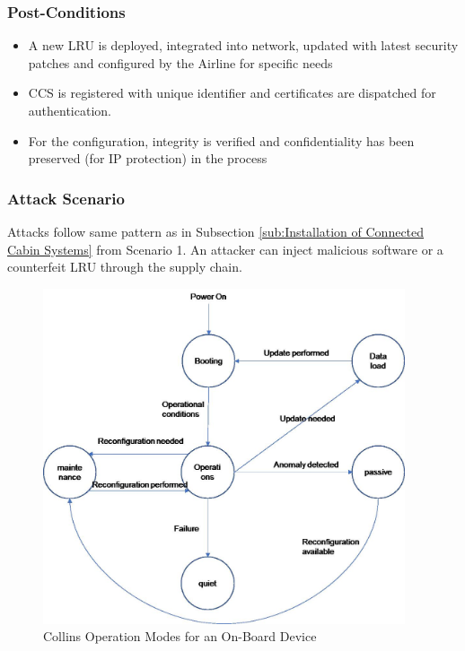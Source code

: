 \subsubsection{Post-Conditions}
\begin{itemize}
	\item A new LRU  is deployed, integrated into network, updated with latest security patches and configured by
	      the Airline for specific needs
	\item CCS is registered with unique identifier and certificates are dispatched for authentication.
	\item For the configuration, integrity is verified and confidentiality has been preserved (for IP protection)
	      in the process
\end{itemize}

\subsubsection{Attack Scenario}

Attacks follow same pattern as in Subsection \ref{sub:Installation of Connected Cabin Systems} from Scenario 1.
An attacker can inject malicious software or a counterfeit LRU through the supply chain.

\begin{figure}
	\begin{center}
		\includegraphics[width=0.95\textwidth]{figures/collins-opmodes.jpg}
	\end{center}
	\caption{Collins Operation Modes for an On-Board Device}
	\label{fig:collins-opmodes}
\end{figure}

